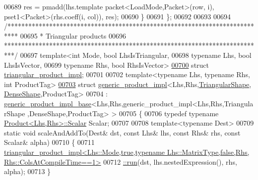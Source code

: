 \begin{DoxyCode}
00689       res =  pmadd(lhs.template packet<LoadMode,Packet>(row, i), pset1<Packet>(rhs.coeff(i, col)), res);
00690   \}
00691 \};
00692 
00693 
00694 \textcolor{comment}{/***************************************************************************}
00695 \textcolor{comment}{* Triangular products}
00696 \textcolor{comment}{***************************************************************************/}
00697 \textcolor{keyword}{template}<\textcolor{keywordtype}{int} Mode, \textcolor{keywordtype}{bool} LhsIsTriangular,
00698          \textcolor{keyword}{typename} Lhs, \textcolor{keywordtype}{bool} LhsIsVector,
00699          \textcolor{keyword}{typename} Rhs, \textcolor{keywordtype}{bool} RhsIsVector>
\hyperlink{struct_eigen_1_1internal_1_1triangular__product__impl}{00700} \textcolor{keyword}{struct }\hyperlink{struct_eigen_1_1internal_1_1triangular__product__impl}{triangular\_product\_impl};
00701 
00702 \textcolor{keyword}{template}<\textcolor{keyword}{typename} Lhs, \textcolor{keyword}{typename} Rhs, \textcolor{keywordtype}{int} ProductTag>
\hyperlink{struct_eigen_1_1internal_1_1generic__product__impl_3_01_lhs_00_01_rhs_00_01_triangular_shape_00_4d5779e6000f2bc51bed3ea9b35ea4da}{00703} \textcolor{keyword}{struct }\hyperlink{struct_eigen_1_1internal_1_1generic__product__impl}{generic\_product\_impl}<Lhs,Rhs,\hyperlink{struct_eigen_1_1_triangular_shape}{TriangularShape},
      \hyperlink{struct_eigen_1_1_dense_shape}{DenseShape},ProductTag>
00704   : \hyperlink{struct_eigen_1_1internal_1_1generic__product__impl__base}{generic\_product\_impl\_base}<Lhs,Rhs,generic\_product\_impl<Lhs,Rhs,TriangularShape
      ,DenseShape,ProductTag> >
00705 \{
00706   \textcolor{keyword}{typedef} \textcolor{keyword}{typename} \hyperlink{group___core___module_class_eigen_1_1_product}{Product<Lhs,Rhs>::Scalar} Scalar;
00707   
00708   \textcolor{keyword}{template}<\textcolor{keyword}{typename} Dest>
00709   \textcolor{keyword}{static} \textcolor{keywordtype}{void} scaleAndAddTo(Dest& dst, \textcolor{keyword}{const} Lhs& lhs, \textcolor{keyword}{const} Rhs& rhs, \textcolor{keyword}{const} Scalar& alpha)
00710   \{
00711     
      \hyperlink{struct_eigen_1_1internal_1_1triangular__product__impl}{triangular\_product\_impl<Lhs::Mode,true,typename Lhs::MatrixType,false,Rhs, Rhs::ColsAtCompileTime==1>}
00712 \hyperlink{struct_eigen_1_1internal_1_1triangular__product__impl}{        ::run}(dst, lhs.nestedExpression(), rhs, alpha);
00713   \}

\end{DoxyCode}
